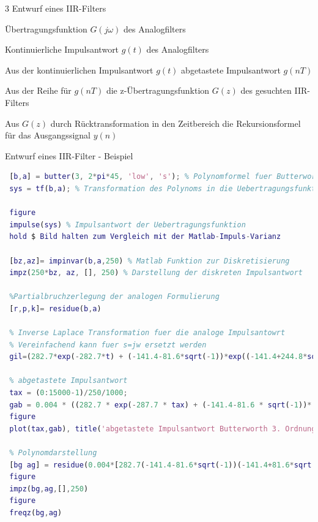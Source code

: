 \documentclass[a4paper]{article}
\begin{document}
\begin{multicols}{3}
  Entwurf eines IIR-Filters

  \begin{enumerate*}
    \def\labelenumi{\arabic{enumi}.}
    \item Übertragungsfunktion $G(j\omega)$ des Analogfilters
    \item Kontinuierliche Impulsantwort $g(t)$ des Analogfilters
    \item Aus der kontinuierlichen Impulsantwort $g(t)$ abgetastete Impulsantwort $g(nT)$
    \item Aus der Reihe für $g(nT)$ die z-Übertragungsfunktion $G(z)$ des gesuchten IIR-Filters
    \item Aus $G(z)$ durch Rücktransformation in den Zeitbereich die Rekursionsformel für das Ausgangssignal $y(n)$
  \end{enumerate*}

  Entwurf eines IIR-Filter - Beispiel
  \begin{lstlisting}[language=matlab]
 % Analoger Tiefpass bei 45 Hz
 [b,a] = butter(3, 2*pi*45, 'low', 's'); % Polynomformel fuer Butterworth-Tiefpass
 sys = tf(b,a); % Transformation des Polynoms in die Uebertragungsfunktion
 
 figure
 impulse(sys) % Impulsantwort der Uebertragungsfunktion
 hold $ Bild halten zum Vergleich mit der Matlab-Impuls-Varianz
 
 [bz,az]= impinvar(b,a,250) % Matlab Funktion zur Diskretisierung
 impz(250*bz, az, [], 250) % Darstellung der diskreten Impulsantwort
 
 %Partialbruchzerlegung der analogen Formulierung
 [r,p,k]= residue(b,a)
 
 % Inverse Laplace Transformation fuer die analoge Impulsantowrt
 % Vereinfachend kann fuer s=jw ersetzt werden
 gil=(282.7*exp(-282.7*t) + (-141.4-81.6*sqrt(-1))*exp((-141.4+244.8*sqrt(-1))*t) + (-141.4+81.6*sqrt(-1))*exp((-141.4-244.8*sqrt(-1))*t))
 
 % abgetastete Impulsantwort
 tax = (0:15000-1)/250/1000;
 gab = 0.004 * ((282.7 * exp(-287.7 * tax) + (-141.4-81.6 * sqrt(-1))* exp((-141.4+244.8*sqrt(-1))*tax) + (-141.4+81.6*sqrt(-1))* exp((-141.4-244.8*sqrt(-1))*tax)));
 figure
 plot(tax,gab), title('abgetastete Impulsantwort Butterworth 3. Ordnung')
 
 % Polynomdarstellung
 [bg ag] = residue(0.004*[282.7(-141.4-81.6*sqrt(-1))(-141.4+81.6*sqrt(-1))], [exp(-282.7/250) exp((-141.4+244.8*sqrt(-1))/250) exp((-141.4 -244.8 *sqrt(-1))/250)], [0])
 figure
 impz(bg,ag,[],250)
 figure
 freqz(bg,ag) 
 \end{lstlisting}


\end{multicols}
\end{document}
